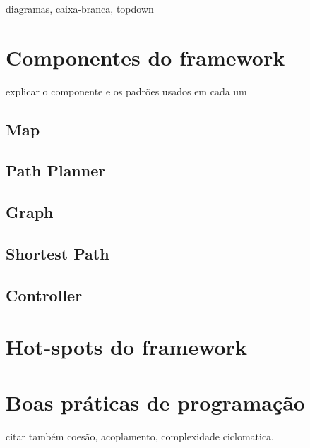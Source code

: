 diagramas, caixa-branca, topdown

\section{Componentes do framework}

explicar o componente e os padrões usados em cada um

\subsection{Map}
\subsection{Path Planner}
\subsection{Graph}
\subsection{Shortest Path}
\subsection{Controller}

\section{Hot-spots do framework}

\section{Boas práticas de programação}
citar também coesão, acoplamento, complexidade ciclomatica.